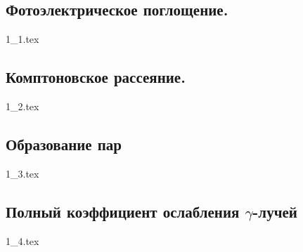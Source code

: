 \documentclass[a5paper, 10pt, twoside]{article} %
\begin{document}
  \subsection{Фотоэлектрическое поглощение.}
  {1_1.tex}

  \subsection{Комптоновское рассеяние.}
  {1_2.tex}

  \subsection{Образование пар}
  {1_3.tex}

  \subsection{Полный коэффициент ослабления $\gamma$-лучей}
  {1_4.tex}
\end{document}
